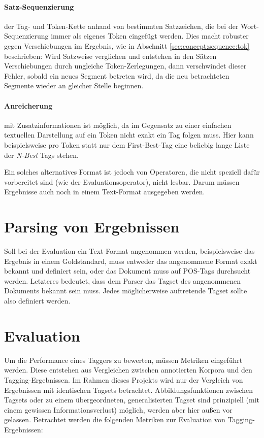 \paragraph{Satz-Sequenzierung} der Tag- und Token-Kette anhand von bestimmten Satzzeichen, die bei der Wort-Sequenzierung immer als eigenes Token eingefügt werden. Dies macht robuster gegen Verschiebungen im Ergebnis, wie in Abschnitt \ref{sec:concept:sequence:tok} beschrieben: Wird Satzweise verglichen und entstehen in den Sätzen Verschiebungen durch ungleiche Token-Zerlegungen, dann verschwindet dieser Fehler, sobald ein neues Segment betreten wird, da die neu betrachteten Segmente wieder an gleicher Stelle beginnen.
\paragraph{Anreicherung} mit Zusatzinformationen ist möglich, da im Gegensatz zu einer einfachen textuellen Darstellung auf ein Token nicht exakt ein Tag folgen muss. Hier kann beispielsweise pro Token statt nur dem First-Best-Tag eine beliebig lange Liste der \textit{N-Best} Tags stehen.

Ein solches alternatives Format ist jedoch von Operatoren, die nicht speziell dafür vorbereitet sind (wie der Evaluationsoperator), nicht lesbar. Darum müssen Ergebnisse auch noch in einem Text-Format ausgegeben werden.

\section{Parsing von Ergebnissen}
Soll bei der Evaluation ein Text-Format angenommen werden, beispielsweise das Ergebnis in einem Goldstandard, muss entweder das angenommene Format exakt bekannt und definiert sein, oder das Dokument muss auf POS-Tags durchsucht werden. Letzteres bedeutet, dass dem Parser das Tagset des angenommenen Dokuments bekannt sein muss. Jedes möglicherweise auftretende Tagset sollte also definiert werden.

\section{Evaluation}
\label{sec:concept:eval}
Um die Performance eines Taggers zu bewerten, müssen Metriken eingeführt werden. Diese entstehen aus Vergleichen zwischen annotierten Korpora und den Tagging-Ergebnissen. Im Rahmen dieses Projekts wird nur der Vergleich von Ergebnissen mit identischen Tagsets betrachtet. Abbildungsfunktionen zwischen Tagsets oder zu einem übergeordneten, generalisierten Tagset sind prinzipiell (mit einem gewissen Informationsverlust) möglich, werden aber hier außen vor gelassen. Betrachtet werden die folgenden Metriken zur Evaluation von Tagging-Ergebnissen:



